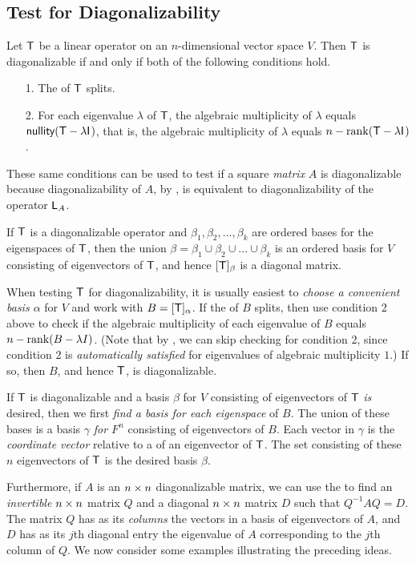 \subsection{Test for Diagonalizability} \label{sec 5.2.1}

Let \(\textsf{T}\) be a linear operator on an \(n\)-dimensional vector space \(V\).
Then \(\textsf{T}\) is diagonalizable if and only if both of the following conditions hold.
\begin{enumerate}
\item[1.] The \CPOLY{} of \(\textsf{T}\) splits. 
\item[2.] For each eigenvalue \(\lambda\) of \(\textsf{T}\), the algebraic multiplicity of \(\lambda\) equals \(\textsf{nullity}(\textsf{T} - \lambda \textsf{I}_{_{}})\), 
that is, the algebraic multiplicity of \(\lambda\) equals \(n - \mathrm{rank}(\textsf{T} - \lambda \textsf{I}_{_{}})\).
\end{enumerate}
These same conditions can be used to test if a square \emph{matrix} \(A\) is diagonalizable because diagonalizability of \(A\), by , is equivalent to diagonalizability of the operator \(\textsf{L}_A\).

If \(\textsf{T}\) is a diagonalizable operator and \(\beta_1, \beta_2, ..., \beta_k\) are ordered bases for the eigenspaces of \(\textsf{T}\), then the union \(\beta = \beta_1 \cup \beta_2 \cup ... \cup \beta_k\) is an ordered basis for \(V\) consisting of eigenvectors of \(\textsf{T}\),
and hence \([\textsf{T}]_{\beta}\) is a diagonal matrix.

When testing \(\textsf{T}\) for diagonalizability, it is usually easiest to \emph{choose a convenient basis \(\alpha\)} for \(V\) and work with \(B = [\textsf{T}]_{\alpha}\).
If the \CPOLY{} of \(B\) splits, then use condition 2 above to check if the algebraic multiplicity of each eigenvalue of \(B\) equals \(n - \mathrm{rank}(B - \lambda I)\).
(Note that by , we can skip checking for condition 2, since condition 2 is \emph{automatically satisfied} for eigenvalues of algebraic multiplicity \(1\).)
If so, then \(B\), and hence \(\textsf{T}\), is diagonalizable.

If \(\textsf{T}\) is diagonalizable and a basis \(\beta\) for \(V\) consisting of eigenvectors of \(\textsf{T}\) \emph{is} desired, then we first \emph{find a basis for each eigenspace} of \(B\).
The union of these bases is a basis \(\gamma\) \emph{for \(F^n\)} consisting of eigenvectors of \(B\).
Each vector in \(\gamma\) is the \emph{coordinate vector} relative to a of an eigenvector of \(\textsf{T}\).
The set consisting of these \(n\) eigenvectors of \(\textsf{T}\) is the desired basis \(\beta\).

Furthermore, if \(A\) is an \(n \times n\) diagonalizable matrix, we can use the  to find an \emph{invertible} \(n \times n\) matrix \(Q\) and a diagonal \(n \times n\) matrix \(D\) such that \(Q^{-1} A Q = D\).
The matrix \(Q\) has as its \emph{columns} the vectors in a basis of eigenvectors of \(A\), and \(D\) has as its \(j\)th diagonal entry the eigenvalue of \(A\) corresponding to the \(j\)th column of \(Q\).
We now consider some examples illustrating the preceding ideas.


